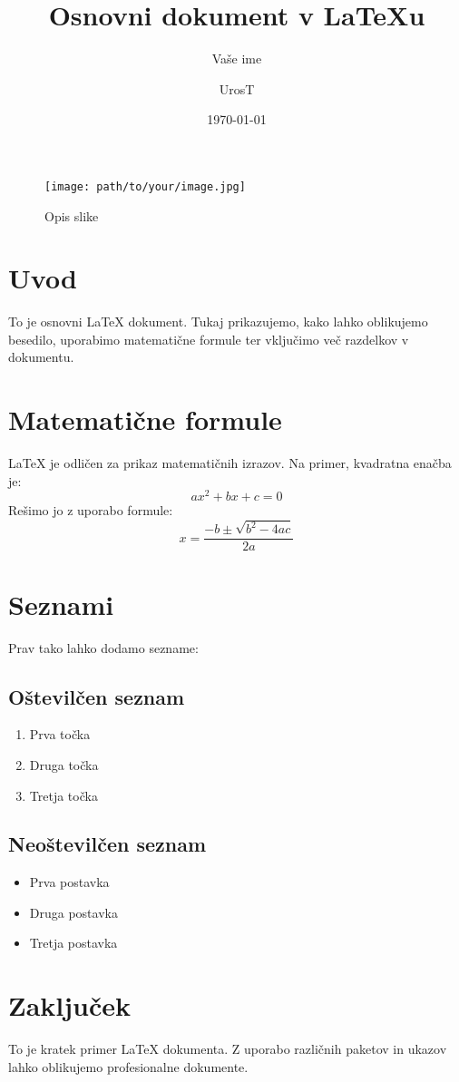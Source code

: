 \documentclass{article} %
\title{Osnovni dokument v LaTeXu}
\author{Vaše ime}
\date{\today} %
\begin{document}
\author{UrosT}

\maketitle

\maketitle %
\begin{figure}[h!]
    \centering
    \texttt{[image: path/to/your/image.jpg]}
    \caption{Opis slike}
    \label{fig:sample-image}
\end{figure}
\section{Uvod}
To je osnovni LaTeX dokument. Tukaj prikazujemo, kako lahko oblikujemo besedilo, uporabimo matematične formule ter vključimo več razdelkov v dokumentu.

\section{Matematične formule}
LaTeX je odličen za prikaz matematičnih izrazov. Na primer, kvadratna enačba je:
\[
ax^2 + bx + c = 0
\]
Rešimo jo z uporabo formule:
\[
x = \frac{-b \pm \sqrt{b^2 - 4ac}}{2a}
\]

\section{Seznami}
Prav tako lahko dodamo sezname:
\subsection{Oštevilčen seznam}
\begin{enumerate}
    \item Prva točka
    \item Druga točka
    \item Tretja točka
\end{enumerate}

\subsection{Neoštevilčen seznam}
\begin{itemize}
    \item Prva postavka
    \item Druga postavka
    \item Tretja postavka
\end{itemize}

\section{Zaključek}
To je kratek primer LaTeX dokumenta. Z uporabo različnih paketov in ukazov lahko oblikujemo profesionalne dokumente.
\end{document}
